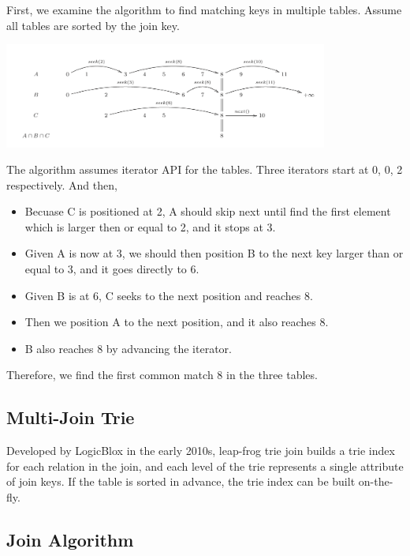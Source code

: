 \documentclass[11pt]{article}
\begin{document}
First, we examine the algorithm to find matching keys in multiple tables\cite{veldhuizen2012leapfrog}. Assume all tables are sorted by the join key.

\begin{center}
    \includegraphics[width=0.8\textwidth]{img/figure1.png}
\end{center}

The algorithm assumes iterator API for the tables. Three iterators start at 0, 0, 2 respectively. And then,

\begin{itemize}
    \item Becuase C is positioned at 2, A should skip next until find the first element which is larger then or equal to 2, and it stops at 3.
    \item Given A is now at 3, we should then position B to the next key larger than or equal to 3, and it goes directly to 6.
    \item Given B is at 6, C seeks to the next position and reaches 8.
    \item Then we position A to the next position, and it also reaches 8.
    \item B also reaches 8 by advancing the iterator.
\end{itemize}

Therefore, we find the first common match 8 in the three tables.

\subsection{Multi-Join Trie}

Developed by LogicBlox in the early 2010s, leap-frog trie join builds a trie index for each relation in the join, and
each level of the trie represents a single attribute of join keys. If the table is sorted in advance, the trie index can
be built on-the-fly.

\subsection{Join Algorithm}
\end{document}
